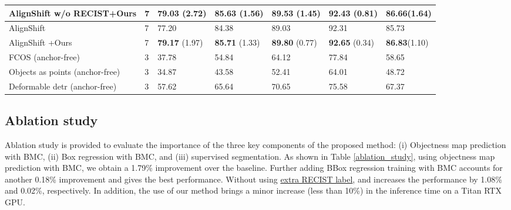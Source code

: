 \documentclass[runningheads]{llncs}
\begin{document}
\begin{table}[t]
\begin{lrbox}{\tablebox}
\begin{tabular}{p{58mm}p{8mm}<{\centering}p{22mm}<{\centering}p{23mm}<{\centering}p{23mm}<{\centering}p{23mm}<{\centering}p{23mm}<{\centering}}
AlignShift w/o RECIST+Ours&7&79.03 (2.72)&85.63 (1.56) &89.53 (1.45)& 92.43 (0.81)&86.66(1.64)\\
\midrule
AlignShift \cite{yang2020alignshift}&7&77.20&84.38&89.03&92.31&85.73\\
AlignShift +Ours&7&\textbf{79.17} (1.97)&\textbf{85.71} (1.33) &\textbf{89.80} (0.77)& \textbf{92.65} (0.34)&\textbf{86.83}(1.10)\\
\toprule[1pt]
FCOS (anchor-free) \cite{tian2019fcos}&3&37.78&54.84&64.12&77.84&58.65\\
Objects as points (anchor-free)\cite{zhou2019objectsaspotints}&3&34.87&43.58&52.41&64.01&48.72\\
Deformable detr (anchor-free) \cite{zhu2020deformable}&3&57.62&65.64&70.65&75.58&67.37\\
\bottomrule[1.5pt]
\end{tabular}

\end{lrbox}
\scalebox{0.65}{\usebox{\tablebox}}
\end{table}


\subsection{Ablation study}
Ablation study is provided to evaluate the importance of the three key components of the proposed method: (i) Objectness map prediction with BMC, (ii) Box regression with BMC, and (iii)  supervised segmentation.  As shown in Table \ref{ablation_study},  using objectness map prediction with BMC, we obtain a 1.79\% improvement over the baseline. Further adding BBox regression training with BMC accounts for another 0.18\% improvement and gives the best performance. Without using \underline{extra RECIST label},  and  increases the performance by 1.08\% and 0.02\%, respectively. In addition, the use of our method brings a minor increase (less than 10\%) in the inference time on a Titan RTX GPU.
\end{document}
